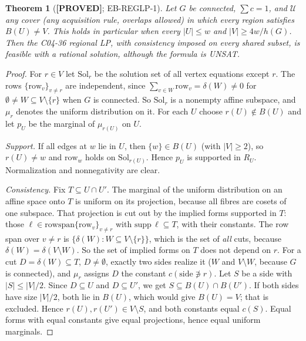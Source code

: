 \documentclass[11pt]{article}
\newtheorem{theorem}{Theorem}
\theoremstyle{remark}
\newcommand{\lab}[1]{\textbf{[#1]}}
\begin{document}
\begin{theorem}[\lab{PROVED}; EB-REGLP-1]\label{thm:main}
Let $G$ be connected, $\sum c=1$, and $\mathcal U$ \emph{any} cover (any acquisition rule, overlaps
allowed) in which every region satisfies $B(U)\ne V$. This holds in particular when every
$|U|\le w$ and $|V|\ge 4w/h(G)$. Then the C04-36 regional LP, with consistency imposed on
\emph{every} shared subset, is feasible with a rational solution, although the formula is UNSAT.
\end{theorem}
\begin{proof}
For $r\in V$ let $\mathrm{Sol}_r$ be the solution set of all vertex equations except $r$. The
rows $\{\mathrm{row}_v\}_{v\ne r}$ are independent, since $\sum_{v\in W}\mathrm{row}_v=\delta(W)\ne 0$
for $\emptyset\ne W\subseteq V\setminus\{r\}$ when $G$ is connected. So $\mathrm{Sol}_r$ is a nonempty affine subspace, and $\mu_r$ denotes the uniform distribution on it.
For each $U$ choose $r(U)\notin B(U)$ and let $p_U$ be the marginal of $\mu_{r(U)}$ on $U$.

\emph{Support.} If all edges at $w$ lie in $U$, then $\{w\}\in B(U)$ (with $|V|\ge 2$), so
$r(U)\ne w$ and $\mathrm{row}_w$ holds on $\mathrm{Sol}_{r(U)}$. Hence $p_U$ is supported in $R_U$.
Normalization and nonnegativity are clear.

\emph{Consistency.} Fix $T\subseteq U\cap U'$. The marginal of the uniform distribution on an affine
space onto $T$ is uniform on its projection, because all fibres are cosets of one subspace. That projection is cut out by the
implied forms supported in $T$: those $\ell\in\mathrm{rowspan}\{\mathrm{row}_v\}_{v\ne r}$ with
$\mathrm{supp}\,\ell\subseteq T$, with their constants. The row span over $v\ne r$ is $\{\delta(W):W\subseteq V\setminus\{r\}\}$, which is the set of
\emph{all} cuts, because $\delta(W)=\delta(V\setminus W)$. So the set of implied forms on $T$ does not depend on
$r$. For a cut $D=\delta(W)\subseteq T$, $D\ne\emptyset$, exactly two sides realize it
($W$ and $V\setminus W$, because $G$ is connected), and $\mu_r$ assigns $D$ the constant $c(\text{side}\not\ni r)$.
Let $S$ be a side with $|S|\le|V|/2$. Since $D\subseteq U$ and $D\subseteq U'$, we get $S\subseteq B(U)\cap B(U')$. If both sides have size $|V|/2$, both lie in $B(U)$, which would give $B(U)=V$; that is excluded. Hence $r(U),r(U')\in V\setminus S$, and both constants equal $c(S)$.
Equal forms with equal constants give equal projections, hence equal uniform marginals.
\end{proof}
\end{document}
